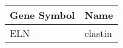 \begin{tabular}{ll}
\toprule
Gene Symbol &    Name \\
\midrule
        ELN & elastin \\
\bottomrule
\end{tabular}
